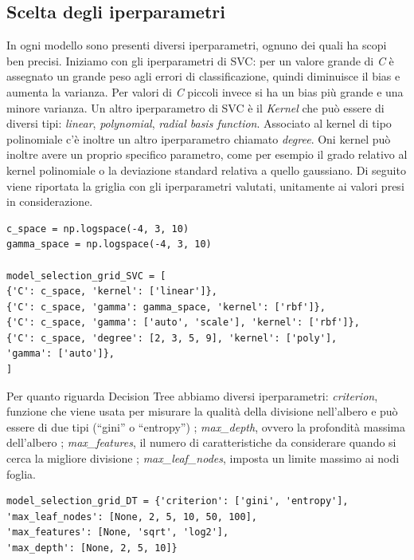 \documentclass[12pt,italian]{report}
\begin{document}
\subsection{Scelta degli iperparametri}
\label{iperparametri}
In ogni modello sono presenti diversi iperparametri, ognuno dei quali ha scopi ben precisi. 
Iniziamo con gli iperparametri di SVC: per un valore grande di \emph{C} è assegnato un grande peso agli errori di classificazione, quindi diminuisce il bias e aumenta la varianza. Per valori di \emph{C} piccoli invece si ha un bias più grande e una minore varianza. 
Un altro iperparametro di SVC è il \emph{Kernel} che può essere di diversi tipi: \emph{linear}, \emph{polynomial}, \emph{radial basis function}. Associato al kernel di tipo polinomiale c'è inoltre un altro iperparametro chiamato \emph{degree}. Oni kernel può inoltre avere un proprio specifico parametro, come per esempio il grado relativo al kernel polinomiale o la deviazione standard relativa a quello gaussiano.
Di seguito viene riportata la griglia con gli iperparametri valutati, unitamente ai valori presi in considerazione.

\begin{lstlisting}[frame=single, basicstyle=\footnotesize]
c_space = np.logspace(-4, 3, 10)
gamma_space = np.logspace(-4, 3, 10)

model_selection_grid_SVC = [
{'C': c_space, 'kernel': ['linear']},
{'C': c_space, 'gamma': gamma_space, 'kernel': ['rbf']},
{'C': c_space, 'gamma': ['auto', 'scale'], 'kernel': ['rbf']},
{'C': c_space, 'degree': [2, 3, 5, 9], 'kernel': ['poly'],
'gamma': ['auto']},
]
\end{lstlisting}

Per quanto riguarda Decision Tree abbiamo diversi iperparametri: \emph{criterion}, funzione che viene usata per misurare la qualità della divisione nell'albero e può essere di due tipi (``gini'' o ``entropy'') \cite{scikit-learn}; \emph{max\_depth}, ovvero la profondità massima dell'albero \cite{scikit-learn}; \emph{max\_features}, il numero di caratteristiche da considerare quando si cerca la migliore divisione \cite{scikit-learn}; \emph{max\_leaf\_nodes}, imposta un limite massimo ai nodi foglia.

\begin{lstlisting}[frame=single, basicstyle=\footnotesize]
model_selection_grid_DT = {'criterion': ['gini', 'entropy'],
'max_leaf_nodes': [None, 2, 5, 10, 50, 100],
'max_features': [None, 'sqrt', 'log2'],
'max_depth': [None, 2, 5, 10]}
\end{lstlisting}
\end{document}
